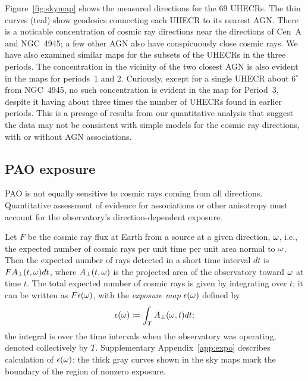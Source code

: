 Figure~\ref{fig:skymap} shows the measured directions for the 69 UHECRs.
The thin curves (teal) show
geodesics connecting each UHECR to its nearest AGN.
There is a noticable concentration of cosmic ray directions near the
directions of Cen~A and NGC~4945; a few other AGN also have conspicuously
close cosmic rays.  We have also examined similar maps for the subsets
of the UHECRs in the three periods.
The concentration in the vicinity of the two closest AGN
is also evident in the maps for periods~1 and 2.
Curiously, except for a single UHECR about $6^\circ$
from NGC~4945, no such concentration is evident in the map for Period~3,
despite it having about three times the number of UHECRs found in earlier
periods.  This is a presage of results from our quantitative analysis that
suggest the data may not be consistent with simple models for the cosmic ray
directions, with or without AGN associations.

\subsection{PAO exposure}

PAO is not equally sensitive to cosmic rays coming from all directions.
Quantitative assessment of evidence for associations or other anisotropy must
account for the observatory's direction-dependent exposure.

Let $F$ be the cosmic ray flux at Earth from a source at a given direction,
$\omega$, i.e., the expected number of cosmic rays per unit time per unit
area normal to $\omega$.   Then the expected number of rays detected in a
short time interval $dt$ is $F A_\perp(t,\omega) dt$, where $A_\perp(t,\omega)$ is
the projected area of the observatory toward $\omega$ at time $t$. The total
expected number of cosmic rays is given by integrating over $t$; it can be
written as $F\epsilon(\omega)$, with the {\em exposure map} $\epsilon(\omega)$
defined by
\begin{equation}
\expo(\tdrxn) \coloneqq \int_T  \Aperp(\tdrxn,t) dt;
\label{expo-def-main}
\end{equation}
the integral is over the time intervals when the observatory was operating,
denoted collectively by $T$.
Supplementary Appendix~\ref{app:expo} describes calculation of
$\epsilon(\omega)$; the thick gray curves shown in the sky maps mark the
boundary of the region of nonzero exposure.
